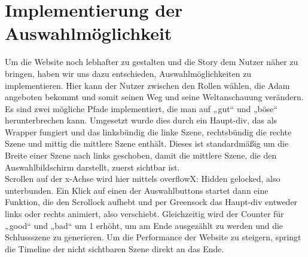 \section{Implementierung der Auswahlmöglichkeit}
Um die Website noch lebhafter zu gestalten und die Story dem Nutzer näher zu bringen, haben wir uns dazu entschieden, Auswahlmöglichkeiten zu implementieren. Hier kann der Nutzer zwischen den Rollen wählen, die Adam angeboten bekommt und somit seinen Weg und seine Weltanschauung verändern. Es sind zwei mögliche Pfade implementiert, die man auf „gut“ und „böse“ herunterbrechen kann.
Umgesetzt wurde dies durch ein Haupt-div, das als Wrapper fungiert und das linksbündig die linke Szene, rechtsbündig die rechte Szene und mittig die mittlere Szene enthält. Dieses ist standardmäßig um die Breite einer Szene nach links geschoben, damit die mittlere Szene, die den Auswahlbildschirm darstellt, zuerst sichtbar ist.\\
Scrollen auf der x-Achse wird hier mittels overflowX: Hidden gelocked, also unterbunden.
Ein Klick auf einen der Auswahlbuttons startet dann eine Funktion, die den Scrollock aufhebt und per Greensock das Haupt-div entweder links oder rechts animiert, also verschiebt. Gleichzeitig wird der Counter für „good“ und „bad“ um 1 erhöht, um am Ende ausgezählt zu werden und die Schlussszene zu generieren. Um die Performance der Website zu steigern, springt die Timeline der nicht sichtbaren Szene direkt an das Ende.